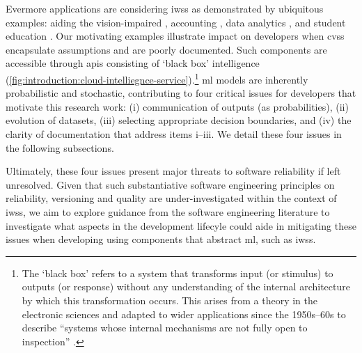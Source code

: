 Evermore applications are considering \glspl{iws} as demonstrated by ubiquitous examples: aiding the vision-impaired \citep{Reis:2018cp,daMotaSilveira:2017vp}, accounting  \citep{Marshall:2018uj}, data analytics \citep{Iyengar:2017fb}, and student education \citep{Dibia:2017iy}.
Our motivating examples illustrate impact on developers when \glspl{cvs} encapsulate assumptions and are poorly documented. Such components are accessible through \glspl{api} consisting of `black box' intelligence (\cref{fig:introduction:cloud-intelliegnce-service}).\footnote{The `black box' refers to a system that transforms input (or stimulus)  to outputs (or response) without any understanding of the internal architecture by which this transformation occurs. This arises from a theory in the electronic sciences and adapted to wider applications since the 1950s--60s \citep{Ashby:1957db,Bunge:1963jm} to describe ``systems whose internal mechanisms are not fully open to inspection'' \citep{Ashby:1957db}. }
\gls{ml} models are inherently probabilistic and stochastic, contributing to four critical issues for developers that motivate this research work: (i) communication of outputs (as probabilities), (ii) evolution of datasets, (iii) selecting appropriate decision boundaries, and (iv) the clarity of documentation that address items i--iii. We detail these four issues in the following subsections.

Ultimately, these four issues present major threats to software reliability if left unresolved. Given that such substantiative software engineering principles on reliability, versioning and quality  are under-investigated within the context of \glspl{iws}, we aim to explore guidance from the software engineering literature to investigate what aspects in the development lifecyle could aide in mitigating these issues when developing using components that abstract \gls{ml}, such as \glspl{iws}.

